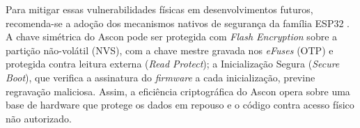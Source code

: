 Para mitigar essas vulnerabilidades físicas em desenvolvimentos futuros, recomenda-se a adoção dos mecanismos nativos de segurança da família ESP32 \cite{espressif2024flash} \cite{kosemen2021tamper}. A chave simétrica do Ascon pode ser protegida com \textit{Flash Encryption} sobre a partição não-volátil (NVS), com a chave mestre gravada nos \textit{eFuses} (OTP) e protegida contra leitura externa (\textit{Read Protect}); a Inicialização Segura (\textit{Secure Boot}), que verifica a assinatura do \textit{firmware} a cada inicialização, previne regravação maliciosa. Assim, a eficiência criptográfica do Ascon opera sobre uma base de hardware que protege os dados em repouso e o código contra acesso físico não autorizado.